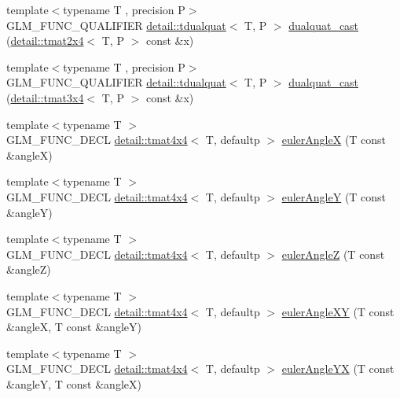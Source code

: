 \begin{DoxyCompactItemize}
\item 
{\footnotesize template$<$typename T , precision P$>$ }\\G\+L\+M\+\_\+\+F\+U\+N\+C\+\_\+\+Q\+U\+A\+L\+I\+F\+I\+ER \hyperlink{structglm_1_1detail_1_1tdualquat}{detail\+::tdualquat}$<$ T, P $>$ \hyperlink{group__gtc__dual__quaternion_gad47c752ec23a5f9924e7d7f84c40f3e5}{dualquat\+\_\+cast} (\hyperlink{structglm_1_1detail_1_1tmat2x4}{detail\+::tmat2x4}$<$ T, P $>$ const \&x)
\item 
{\footnotesize template$<$typename T , precision P$>$ }\\G\+L\+M\+\_\+\+F\+U\+N\+C\+\_\+\+Q\+U\+A\+L\+I\+F\+I\+ER \hyperlink{structglm_1_1detail_1_1tdualquat}{detail\+::tdualquat}$<$ T, P $>$ \hyperlink{group__gtc__dual__quaternion_ga97c4fb8941ad1954e01578cca8182180}{dualquat\+\_\+cast} (\hyperlink{structglm_1_1detail_1_1tmat3x4}{detail\+::tmat3x4}$<$ T, P $>$ const \&x)
\item 
{\footnotesize template$<$typename T $>$ }\\G\+L\+M\+\_\+\+F\+U\+N\+C\+\_\+\+D\+E\+CL \hyperlink{structglm_1_1detail_1_1tmat4x4}{detail\+::tmat4x4}$<$ T, defaultp $>$ \hyperlink{group__gtx__euler__angles_ga97994e53d856ae89ed2622d66ab86c2c}{euler\+AngleX} (T const \&angleX)
\item 
{\footnotesize template$<$typename T $>$ }\\G\+L\+M\+\_\+\+F\+U\+N\+C\+\_\+\+D\+E\+CL \hyperlink{structglm_1_1detail_1_1tmat4x4}{detail\+::tmat4x4}$<$ T, defaultp $>$ \hyperlink{group__gtx__euler__angles_gacdc188a23a928d57d4490ff7d646fb96}{euler\+AngleY} (T const \&angleY)
\item 
{\footnotesize template$<$typename T $>$ }\\G\+L\+M\+\_\+\+F\+U\+N\+C\+\_\+\+D\+E\+CL \hyperlink{structglm_1_1detail_1_1tmat4x4}{detail\+::tmat4x4}$<$ T, defaultp $>$ \hyperlink{group__gtx__euler__angles_gaf55b28c29ebd7ba728f1ad6490c89687}{euler\+AngleZ} (T const \&angleZ)
\item 
{\footnotesize template$<$typename T $>$ }\\G\+L\+M\+\_\+\+F\+U\+N\+C\+\_\+\+D\+E\+CL \hyperlink{structglm_1_1detail_1_1tmat4x4}{detail\+::tmat4x4}$<$ T, defaultp $>$ \hyperlink{group__gtx__euler__angles_ga83a52d36fd752c92ce189197b51ea785}{euler\+Angle\+XY} (T const \&angleX, T const \&angleY)
\item 
{\footnotesize template$<$typename T $>$ }\\G\+L\+M\+\_\+\+F\+U\+N\+C\+\_\+\+D\+E\+CL \hyperlink{structglm_1_1detail_1_1tmat4x4}{detail\+::tmat4x4}$<$ T, defaultp $>$ \hyperlink{group__gtx__euler__angles_ga7599a8aaf3bf33b15517dd522a6d8020}{euler\+Angle\+YX} (T const \&angleY, T const \&angleX)

\end{DoxyCompactItemize}
